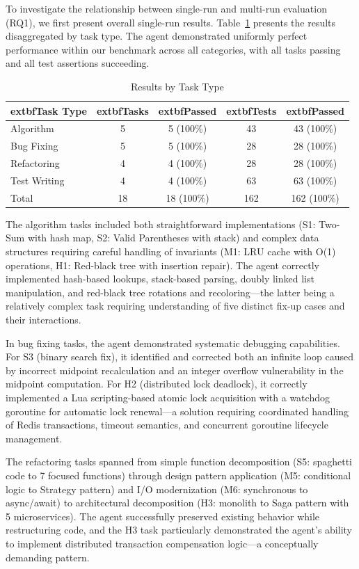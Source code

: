 \documentclass[conference]{IEEEtran}
\begin{document}
To investigate the relationship between single-run and multi-run evaluation (RQ1), we first present overall single-run results. Table~\ref{tab:by_type} presents the results disaggregated by task type. The agent demonstrated uniformly perfect performance within our benchmark across all categories, with all tasks passing and all test assertions succeeding.

\begin{table}[h]
\centering
\caption{Results by Task Type}
\label{tab:by_type}
\small
\begin{tabular}{@{}lcccc@{}}
\toprule
			extbf{Task Type} & 			extbf{Tasks} & 			extbf{Passed} & 			extbf{Tests} & 			extbf{Passed} \\
\midrule
Algorithm & 5 & 5 (100\%) & 43 & 43 (100\%) \\
Bug Fixing & 5 & 5 (100\%) & 28 & 28 (100\%) \\
Refactoring & 4 & 4 (100\%) & 28 & 28 (100\%) \\
Test Writing & 4 & 4 (100\%) & 63 & 63 (100\%) \\
\midrule
Total & 18 & 18 (100\%) & 162 & 162 (100\%) \\
\bottomrule
\end{tabular}
\end{table}

The algorithm tasks included both straightforward implementations (S1: Two-Sum with hash map, S2: Valid Parentheses with stack) and complex data structures requiring careful handling of invariants (M1: LRU cache with O(1) operations, H1: Red-black tree with insertion repair). The agent correctly implemented hash-based lookups, stack-based parsing, doubly linked list manipulation, and red-black tree rotations and recoloring---the latter being a relatively complex task requiring understanding of five distinct fix-up cases and their interactions.

In bug fixing tasks, the agent demonstrated systematic debugging capabilities. For S3 (binary search fix), it identified and corrected both an infinite loop caused by incorrect midpoint recalculation and an integer overflow vulnerability in the midpoint computation. For H2 (distributed lock deadlock), it correctly implemented a Lua scripting-based atomic lock acquisition with a watchdog goroutine for automatic lock renewal---a solution requiring coordinated handling of Redis transactions, timeout semantics, and concurrent goroutine lifecycle management.

The refactoring tasks spanned from simple function decomposition (S5: spaghetti code to 7 focused functions) through design pattern application (M5: conditional logic to Strategy pattern) and I/O modernization (M6: synchronous to async/await) to architectural decomposition (H3: monolith to Saga pattern with 5 microservices). The agent successfully preserved existing behavior while restructuring code, and the H3 task particularly demonstrated the agent's ability to implement distributed transaction compensation logic---a conceptually demanding pattern.
\end{document}
